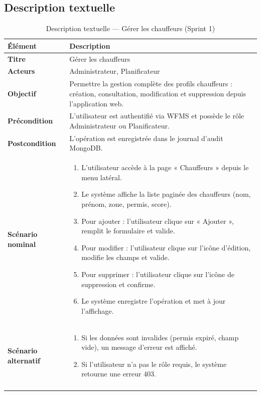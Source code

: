 \subsection{Description textuelle}

\captionsetup[longtable]{justification=centering}
\setlength{\arrayrulewidth}{1pt}
\begin{longtable}{|p{4cm}|p{11cm}|}
\hline
\rowcolor{headerbg}
\textbf{Élément} & \textbf{Description} \\
\hline
\textbf{Titre} & Gérer les chauffeurs \\
\hline
\textbf{Acteurs} & Administrateur, Planificateur \\
\hline
\textbf{Objectif} & Permettre la gestion complète des profils chauffeurs : création, consultation, modification et suppression depuis l'application web. \\
\hline
\textbf{Précondition} & L'utilisateur est authentifié via WFMS et possède le rôle Administrateur ou Planificateur. \\
\hline
\textbf{Postcondition} & L'opération est enregistrée dans le journal d'audit MongoDB. \\
\hline
\textbf{Scénario nominal} &
\begin{enumerate}[start=1, label=\arabic*., nosep, leftmargin=1.4em]
    \item L'utilisateur accède à la page « Chauffeurs » depuis le menu latéral.
    \item Le système affiche la liste paginée des chauffeurs (nom, prénom, zone, permis, score).
    \item Pour ajouter : l'utilisateur clique sur « Ajouter », remplit le formulaire et valide.
    \item Pour modifier : l'utilisateur clique sur l'icône d'édition, modifie les champs et valide.
    \item Pour supprimer : l'utilisateur clique sur l'icône de suppression et confirme.
    \item Le système enregistre l'opération et met à jour l'affichage.
\end{enumerate} \\
\hline
\textbf{Scénario alternatif} &
\begin{enumerate}[start=1, label=\arabic*., nosep, leftmargin=1.4em]
    \item Si les données sont invalides (permis expiré, champ vide), un message d'erreur est affiché.
    \item Si l'utilisateur n'a pas le rôle requis, le système retourne une erreur 403.
\end{enumerate} \\
\hline
\caption{Description textuelle --- Gérer les chauffeurs (Sprint 1)}
\end{longtable}
\setlength{\arrayrulewidth}{0.4pt}

